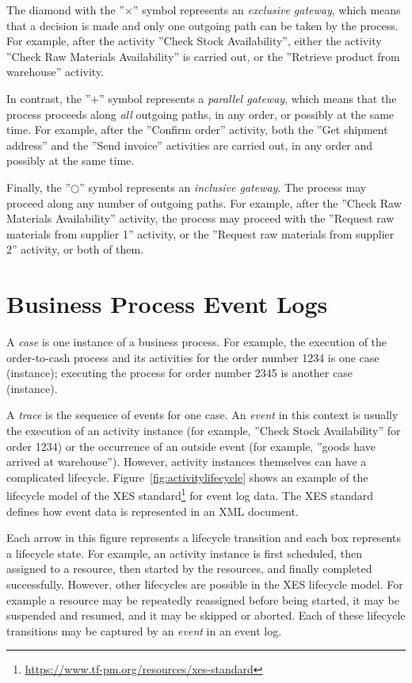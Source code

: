The diamond with the ''$\times$'' symbol represents an \emph{exclusive gateway}, which means that a decision is made and only one outgoing path can be taken by the process. For example, after the activity ''Check Stock Availability'', either the activity ''Check Raw Materials Availability'' is carried out, or the ''Retrieve product from warehouse'' activity. 

In contrast, the ''$+$'' symbol represents a \emph{parallel gateway}, which means that the process proceeds along \emph{all} outgoing paths, in any order, or possibly at the same time. For example, after the ''Confirm order'' activity, both the ''Get shipment address'' and the ''Send invoice'' activities are carried out, in any order and possibly at the same time.

Finally, the ''$\bigcirc$'' symbol represents an \emph{inclusive gateway}. The process may proceed along any number of outgoing paths. For example, after the ''Check Raw Materials Availability'' activity, the process may proceed with the ''Request raw materials from supplier 1'' activity, or the ''Request raw materials from supplier 2'' activity, or both of them.

\section{Business Process Event Logs}

A \emph{case} is one instance of a business process. For example, the execution of the order-to-cash process and its activities for the order number 1234 is one case (instance); executing the process for order number 2345 is another case (instance). 

A \emph{trace} is the sequence of events for one case. An \emph{event} in this context is usually the execution of an activity instance (for example, ''Check Stock Availability'' for order 1234) or the occurrence of an outside event (for example, ''goods have arrived at warehouse''). However, activity instances themselves can have a complicated lifecycle. Figure~\ref{fig:activitylifecycle} shows an example of the lifecycle model of the XES standard\footnote{\url{https://www.tf-pm.org/resources/xes-standard}} for event log data. The XES standard defines how event data is represented in an XML document.

Each arrow in this figure represents a lifecycle transition and each box represents a lifecycle state. For example, an activity instance is first scheduled, then assigned to a resource, then started by the resources, and finally completed successfully. However, other lifecycles are possible in the XES lifecycle model. For example a resource may be repeatedly reassigned before being started, it may be suspended and resumed, and it may be skipped or aborted. Each of these lifecycle transitions may be captured by an \emph{event} in an event log.

